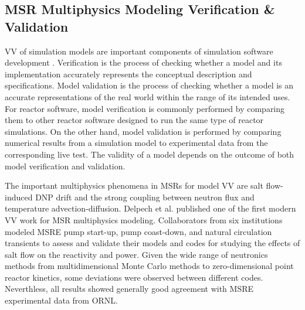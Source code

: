 \subsection{MSR Multiphysics Modeling Verification \& Validation}

\Gls{VV} of simulation models are important components of simulation software development
\cite{sargent_verification_2010}. Verification is the process of checking whether a model and
its implementation accurately represents the conceptual description and specifications. Model
validation is the process of checking whether a model is an accurate representations of the real
world within the range of its intended uses. For reactor software, model verification is commonly
performed by comparing them to other reactor software designed to run the same type of reactor
simulations. On the other hand, model validation is performed by comparing numerical results from
a simulation model to experimental data from the corresponding live test. The validity of a model
depends on the outcome of both model verification and validation.

The important multiphysics phenomena in \glspl{MSR} for model \gls{VV} are salt flow-induced
\gls{DNP} drift and the strong coupling between neutron flux and temperature advection-diffusion.
Delpech et al. \cite{delpech_benchmark_2003}
published one of the first modern \gls{VV} work for \gls{MSR} multiphysics modeling. Collaborators
from six institutions modeled \gls{MSRE} pump start-up, pump coast-down, and natural
circulation transients to assess and validate their models and codes for studying the effects of
salt flow on the reactivity and power. Given the wide range of neutronics methods from
multidimensional Monte Carlo methods to zero-dimensional point reactor kinetics, some deviations
were observed between different codes. Neverthless, all results showed generally good agreement
with \gls{MSRE} experimental data from \gls{ORNL}.

